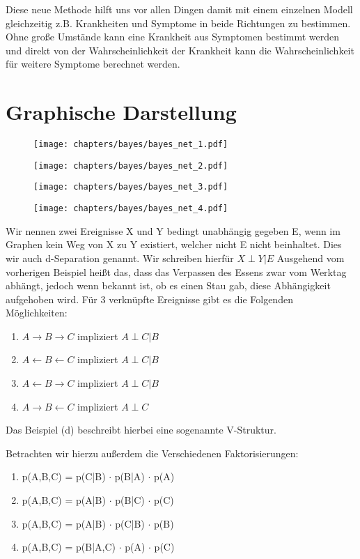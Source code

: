 Diese neue Methode hilft uns vor allen Dingen damit mit einem einzelnen Modell gleichzeitig z.B. Krankheiten und Symptome in beide Richtungen zu bestimmen. Ohne große Umstände kann eine Krankheit aus Symptomen bestimmt werden und direkt von der Wahrscheinlichkeit der Krankheit kann die Wahrscheinlichkeit für weitere Symptome berechnet werden.

\section{Graphische Darstellung}
\begin{figure}[h]
    \centering
    \texttt{[image: chapters/bayes/bayes\_net\_1.pdf]}
\end{figure}
\begin{figure}[h]
    \centering
    \texttt{[image: chapters/bayes/bayes\_net\_2.pdf]}
\end{figure}
\begin{figure}[h]
    \centering
    \texttt{[image: chapters/bayes/bayes\_net\_3.pdf]}
\end{figure}
\begin{figure}[h]
    \centering
    \texttt{[image: chapters/bayes/bayes\_net\_4.pdf]}
\end{figure}

Wir nennen zwei Ereignisse X und Y bedingt unabhängig gegeben E, wenn im Graphen kein Weg von X zu Y existiert, welcher nicht E nicht beinhaltet.
Dies wir auch d-Separation genannt.
Wir schreiben hierfür
$X \perp Y | E$
Ausgehend vom vorherigen Beispiel heißt das, dass das Verpassen des Essens zwar vom Werktag abhängt, jedoch wenn bekannt ist, ob es einen Stau gab, diese Abhängigkeit aufgehoben wird.
Für 3 verknüpfte Ereignisse gibt es die Folgenden Möglichkeiten:
\begin{enumerate}[label=(\alph*)]
\item $A \rightarrow B \rightarrow C$ impliziert $A \perp C | B$
\item $A \leftarrow B \leftarrow C$ impliziert $A \perp C | B$
\item $A \leftarrow B \rightarrow C$ impliziert $A \perp C | B$
\item $A \rightarrow B \leftarrow C$ impliziert $A \perp C$
\end{enumerate}
Das Beispiel (d) beschreibt hierbei eine sogenannte V-Struktur.

Betrachten wir hierzu außerdem die Verschiedenen Faktorisierungen:
\begin{enumerate}[label=(\alph*)]
\item p(A,B,C) = p(C|B) $\cdot$ p(B|A) $\cdot$ p(A)
\item p(A,B,C) = p(A|B) $\cdot$ p(B|C) $\cdot$ p(C)
\item p(A,B,C) = p(A|B) $\cdot$ p(C|B) $\cdot$ p(B)
\item p(A,B,C) = p(B|A,C) $\cdot$ p(A) $\cdot$ p(C)
\end{enumerate}

